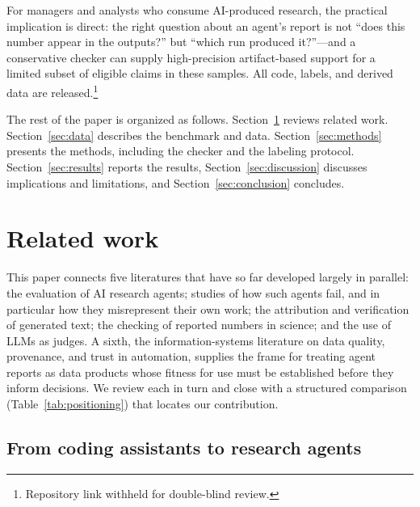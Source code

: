 \documentclass[preprint,12pt,authoryear]{elsarticle}
\newif\ifanon \anontrue
\begin{document}
For managers and analysts who consume AI-produced research, the practical implication is direct: the right question about an agent's report is not ``does this number appear in the outputs?'' but ``which run produced it?''---and a conservative checker can supply high-precision artifact-based support for a limited subset of eligible claims in these samples. All code, labels, and derived data are released.\ifanon\footnote{Repository link withheld for double-blind review.}\else\footnote{\url{https://github.com/mos3b-faqeeh/agent-integrity-analysis}}\fi

The rest of the paper is organized as follows. Section~\ref{sec:related} reviews related work. Section~\ref{sec:data} describes the benchmark and data. Section~\ref{sec:methods} presents the methods, including the checker and the labeling protocol. Section~\ref{sec:results} reports the results, Section~\ref{sec:discussion} discusses implications and limitations, and Section~\ref{sec:conclusion} concludes.

\section{Related work}\label{sec:related}

This paper connects five literatures that have so far developed largely in parallel: the evaluation of AI research agents; studies of how such agents fail, and in particular how they misrepresent their own work; the attribution and verification of generated text; the checking of reported numbers in science; and the use of LLMs as judges. A sixth, the information-systems literature on data quality, provenance, and trust in automation, supplies the frame for treating agent reports as data products whose fitness for use must be established before they inform decisions. We review each in turn and close with a structured comparison (Table~\ref{tab:positioning}) that locates our contribution.

\subsection{From coding assistants to research agents}\label{sec:rw-agents}
\end{document}
